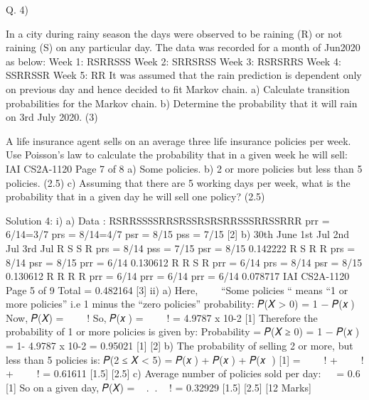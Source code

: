 \documentclass[a4paper,12pt]{article}
\begin{document}
Q. 4) \item  In a city during rainy season the days were observed to be raining (R) or not raining
(S) on any particular day. The data was recorded for a month of Jun2020 as below:
Week 1: RSRRSSS
Week 2: SRRSRSS
Week 3: RSRSRRS
Week 4: SSRRSSR
Week 5: RR
It was assumed that the rain prediction is dependent only on previous day and hence
decided to fit Markov chain.
a) Calculate transition probabilities for the Markov chain. 
b) Determine the probability that it will rain on 3rd July 2020. (3)
\item   A life insurance agent sells on an average three life insurance policies per week. Use
Poisson's law to calculate the probability that in a given week he will sell:
IAI CS2A-1120
Page 7 of 8
a) Some policies. 
b) 2 or more policies but less than 5 policies. (2.5)
c) Assuming that there are 5 working days per week, what is the probability that
in a given day he will sell one policy? (2.5)



Solution 4:
i)
a) Data : RSRRSSSSRRSRSSRSRSRRSSSRRSSRRR
prr = 6/14=3/7
prs = 8/14=4/7
psr = 8/15
pss = 7/15
[2]
b)
30th June 1st Jul 2nd Jul 3rd Jul
R S S R
prs = 8/14 pss = 7/15 psr = 8/15 0.142222
R S R R
prs = 8/14 psr = 8/15 prr = 6/14 0.130612
R R S R
prr = 6/14 prs = 8/14 psr = 8/15 0.130612
R R R R
prr = 6/14 prr = 6/14 prr = 6/14 0.078717
IAI CS2A-1120
Page 5 of 9
Total = 0.482164 [3]
ii)
a)
Here, 
“Some policies “ means “1 or more policies” i.e 1 minus the “zero policies” probability:
𝑃(𝑋 > 0) = 1 − 𝑃(𝑥􀬴)
Now, 𝑃(𝑋) =
􀯘􀰷􀴋􀰓􀳣
􀯫!
So, 𝑃(𝑥􀬴) =
􀯘􀰷􀰯􀬷􀰬
􀬴!
= 4.9787 x 10-2 [1]
Therefore the probability of 1 or more policies is given by:
Probability = 𝑃(𝑋 ≥ 0)
= 1 − 𝑃(𝑥􀬴)
= 1- 4.9787 x 10-2
= 0.95021 [1]
[2]
b)
The probability of selling 2 or more, but less than 5 policies is:
𝑃(2 ≤ 𝑋 < 5) = 𝑃(𝑥􀬶) + 𝑃(𝑥􀬷) + 𝑃(𝑥􀬸 ) [1]
=
􀯘􀰷􀰯􀬷􀰮
􀬶!
+
􀯘􀰷􀰯􀬷􀰯
􀬷!
+
􀯘􀰷􀰯􀬷􀰰
􀬸!
= 0.61611 [1.5]
[2.5]
c)
Average number of policies sold per day: 􀬷
􀬹
= 0.6 [1]
So on a given day, 𝑃(𝑋) =
􀯘􀰷􀰬.􀰲􀬴.􀬺􀰭
􀬵!
= 0.32929 [1.5]
[2.5]
[12 Marks]
\end{document}

